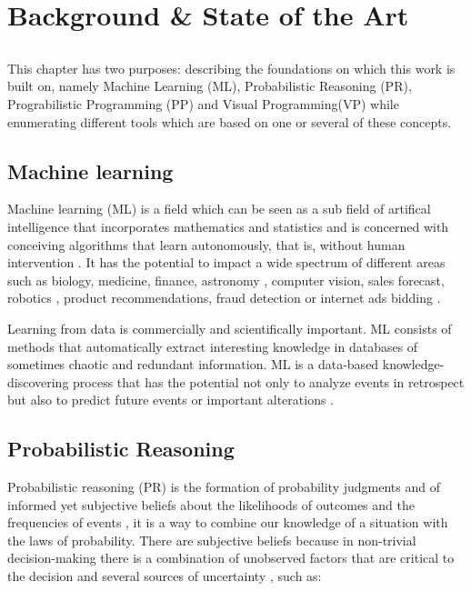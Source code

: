 \chapter{Background \& State of the Art} \label{chap:sota}

\section*{}

This chapter has two purposes: describing the foundations on which this work
is built on, namely Machine Learning (ML), Probabilistic Reasoning (PR),
Prograbilistic Programming (PP) and
Visual Programming(VP) while enumerating different tools which are based
on one or several of these concepts.

\section{Machine learning}

Machine learning (ML) is a field which can be seen as a sub field of artifical
intelligence that incorporates mathematics and statistics and is concerned
with conceiving algorithms that learn autonomously, that is, without human
intervention \cite{mlbrit}\cite{mlnot}.
It has the potential to impact a wide spectrum of
different areas such as biology, medicine, finance, astronomy
\cite{Amatriain:2013:BDU:2541176.2514691}, computer vision, sales forecast,
robotics \cite{intml}, product recommendations, fraud detection or
internet ads bidding \cite{SciPy}.

Learning from data is commercially and scientifically important. ML consists of
methods that automatically extract interesting knowledge in databases of sometimes chaotic and
redundant information. ML is a data-based knowledge-discovering process that
has the potential not only to analyze events in retrospect but also to predict
future events or important alterations \cite{mapt}.

\section{Probabilistic Reasoning}

Probabilistic reasoning (PR) is the formation of probability judgments and of
informed yet subjective beliefs about the likelihoods of outcomes and the frequencies of
events \cite{Lassiter2012}, it is a way to combine our knowledge of a situation
with the laws of probability. There are subjective beliefs because in non-trivial
decision-making there is a combination of unobserved factors that are critical to the decision
and several sources of uncertainty \cite{reas}, such as:

